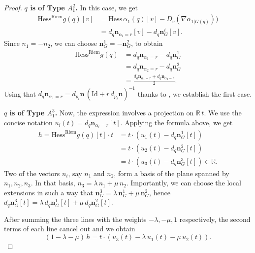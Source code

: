 \documentclass[11pt]{article}
\newcommand{\R}{\mathbb{R}}
\newcommand{\nbf}{\mathbf{n}}
\newcommand{\grad}{\nabla}
\newcommand{\Hess}{\mathrm{Hess}}
\newcommand{\Id}{\mathrm{Id}}
\theoremstyle{plain}
\theoremstyle{definition}
\theoremstyle{remark}
\begin{document}
\begin{proof}
		\textbf{$q$ is of Type $A_1^2$.}
		In this case, we get
		\begin{align*}
			\Hess^{\mathrm{Riem}} g(q)[v] &= \Hess \, \alpha_1(q)[v] - D_v(\grad \alpha_{1|G(q)})) \\
			&= d_q \nbf_{\alpha_i = r}[v] - d_q \nbf^i_G[v].
		\end{align*}
		Since $n_1 = -n_2$, we can choose $\nbf^1_G = -\nbf^2_G$, to obtain
		\begin{align*}
			\Hess^{\mathrm{Riem}} g(q) &= d_q \nbf_{\alpha_1 = r} - d_q \nbf^1_G \\
			&= d_q \nbf_{\alpha_2 = r} - d_q \nbf^2_G \\
			&= \frac{d_q \nbf_{\alpha_1 = r} + d_q \nbf_{\alpha_2 = r}}{2}.
		\end{align*}
		Using that $d_q \nbf_{\alpha_1 = r} = d_{p_i} \nbf \, (\Id + r \, d_{p_i} \nbf )^{-1}$ thanks to , we establish the first case.
		
		\textbf{$q$ is of Type $A_1^3$.}
		Now, the expression involves a projection on $\R \, t$. We use the concise notation $u_i(t) = d_q \nbf_{\alpha_i = r}[t]$. Applying the formula above, we get
		\begin{align*}
			h = \Hess^{\mathrm{Riem}} g(q)[t] \cdot t &= t \cdot (u_1(t) - d_q \nbf^1_G[t]) \\
			&= t \cdot(u_2(t) - d_q \nbf^2_G[t]) \\
			&= t \cdot(u_3(t) - d_q \nbf^3_G[t]) \in \R.
		\end{align*} 
		Two of the vectors $n_i$, say $n_1$ and $n_2$, form a basis of the plane spanned by $n_1,n_2,n_3$. In that basis, $n_3 = \lambda \, n_1 + \mu \, n_2$. Importantly, we can choose the local extensions in such a way that $\nbf^3_G = \lambda \, \nbf^1_G + \mu \, \nbf^2_G$, hence $d_q \nbf^3_G[t] = \lambda \, d_q \nbf^1_G[t] + \mu \, d_q \nbf^2_G[t]$.
		
		After summing the three lines with the weights $-\lambda, -\mu, 1$ respectively, the second terms of each line cancel out and we obtain
		\[(1 - \lambda - \mu) \, h = t \cdot \left(u_3(t) - \lambda \, u_1(t) - \mu \, u_2(t) \right).\]
		

\end{proof}
\end{document}
